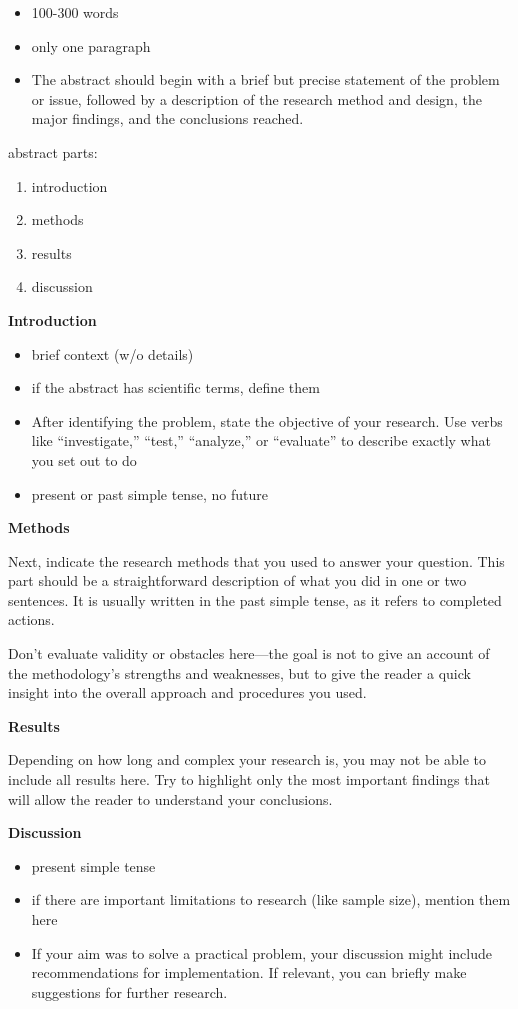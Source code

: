 \begin{itemize}
    \item 100-300 words
    \item only one paragraph
    \item The abstract should begin with a brief but precise statement of the problem or issue, followed by a description of the research method and design, the major findings, and the conclusions reached.
\end{itemize}

abstract parts:

\begin{enumerate}
    \item introduction
    \item methods
    \item results
    \item discussion
\end{enumerate}

\textbf{Introduction}

\begin{itemize}
    \item brief context (w/o details)
    \item if the abstract has scientific terms, define them
    \item After identifying the problem, state the objective of your research. Use verbs like “investigate,” “test,” “analyze,” or “evaluate” to describe exactly what you set out to do
    \item present or past simple tense, no future
\end{itemize}

\textbf{Methods}

Next, indicate the research methods that you used to answer your question. This part should be a straightforward description of what you did in one or two sentences. It is usually written in the past simple tense, as it refers to completed actions.

Don't evaluate validity or obstacles here—the goal is not to give an account of the methodology's strengths and weaknesses, but to give the reader a quick insight into the overall approach and procedures you used.

\textbf{Results}

Depending on how long and complex your research is, you may not be able to include all results here. Try to highlight only the most important findings that will allow the reader to understand your conclusions.

\textbf{Discussion}

\begin{itemize}
    \item present simple tense
    \item if there are important limitations to research (like sample size), mention them here
    \item If your aim was to solve a practical problem, your discussion might include recommendations for implementation. If relevant, you can briefly make suggestions for further research.
\end{itemize}